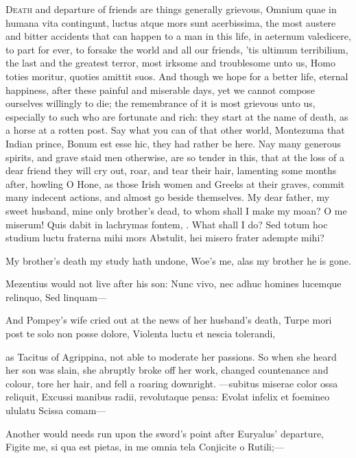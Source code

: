{\lettrine{D}{eath} and departure of friends are things generally grievous, 
Omnium quae in humana vita contingunt, luctus atque mors sunt
acerbissima, the most austere and bitter accidents that can happen to a
man in this life, in aeternum valedicere, to part for ever, to forsake
the world and all our friends, 'tis ultimum terribilium, the last and
the greatest terror, most irksome and troublesome unto us, Homo
toties moritur, quoties amittit suos. And though we hope for a better
life, eternal happiness, after these painful and miserable days, yet we
cannot compose ourselves willingly to die; the remembrance of it is
most grievous unto us, especially to such who are fortunate and rich:
they start at the name of death, as a horse at a rotten post. Say what
you can of that other world, Montezuma that Indian prince, Bonum
est esse hic, they had rather be here. Nay many generous spirits, and
grave staid men otherwise, are so tender in this, that at the loss of a
dear friend they will cry out, roar, and tear their hair, lamenting
some months after, howling O Hone, as those Irish women and
Greeks at their graves, commit many indecent actions, and almost
go beside themselves. My dear father, my sweet husband, mine only
brother's dead, to whom shall I make my moan? O me miserum! Quis dabit
in lachrymas fontem, \etc{}. What shall I do?
Sed totum hoc studium luctu fraterna mihi mors
Abstulit, hei misero frater adempte mihi?

My brother's death my study hath undone,
Woe's me, alas my brother he is gone.

Mezentius would not live after his son:
Nunc vivo, nec adhuc homines lucemque relinquo,
Sed linquam---

And Pompey's wife cried out at the news of her husband's death,
Turpe mori post te solo non posse dolore,
Violenta luctu et nescia tolerandi,

as Tacitus of Agrippina, not able to moderate her passions. So
when she heard her son was slain, she abruptly broke off her work,
changed countenance and colour, tore her hair, and fell a roaring
downright.
---subitus miserae color ossa reliquit,
Excussi manibus radii, revolutaque pensa:
Evolat infelix et foemineo ululatu
Scissa comam---

Another would needs run upon the sword's point after Euryalus'
departure,
Figite me, si qua est pietas, in me omnia tela
Conjicite o Rutili;---

}
